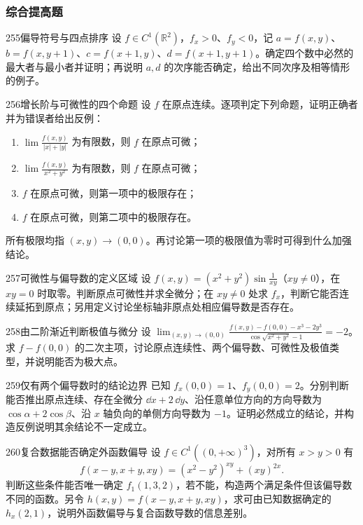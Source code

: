 \subsubsection{综合提高题}
\begin{exercise}{255}{偏导符号与四点排序}
设 $f\in C^1(\mathbb R^2)$，$f_x>0$、$f_y<0$，记 $a=f(x,y)$、$b=f(x,y+1)$、$c=f(x+1,y)$、$d=f(x+1,y+1)$。确定四个数中必然的最大者与最小者并证明；再说明 $a,d$ 的次序能否确定，给出不同次序及相等情形的例子。
\end{exercise}
\begin{exercise}{256}{增长阶与可微性的四个命题}
设 $f$ 在原点连续。逐项判定下列命题，证明正确者并为错误者给出反例：
\begin{enumerate}
\item $\lim\frac{f(x,y)}{|x|+|y|}$ 为有限数，则 $f$ 在原点可微；
\item $\lim\frac{f(x,y)}{x^2+y^2}$ 为有限数，则 $f$ 在原点可微；
\item $f$ 在原点可微，则第一项中的极限存在；
\item $f$ 在原点可微，则第二项中的极限存在。
\end{enumerate}
所有极限均指 $(x,y)\to(0,0)$。再讨论第一项的极限值为零时可得到什么加强结论。
\end{exercise}
\begin{exercise}{257}{可微性与偏导数的定义区域}
设 $f(x,y)=(x^2+y^2)\sin\frac1{xy}$（$xy\ne0$），在 $xy=0$ 时取零。判断原点可微性并求全微分；在 $xy\ne0$ 处求 $f_x$，判断它能否连续延拓到原点；另用定义讨论坐标轴非原点处相应偏导数是否存在。
\end{exercise}
\begin{exercise}{258}{由二阶渐近判断极值与微分}
设 $\lim_{(x,y)\to(0,0)}\frac{f(x,y)-f(0,0)-x^3-2y^3}{\cos\sqrt{x^2+y^2}-1}=-2$。求 $f-f(0,0)$ 的二次主项，讨论原点连续性、两个偏导数、可微性及极值类型，并说明能否为极大点。
\end{exercise}
\begin{exercise}{259}{仅有两个偏导数时的结论边界}
已知 $f_x(0,0)=1$、$f_y(0,0)=2$。分别判断能否推出原点连续、存在全微分 $\dd x+2\,\dd y$、沿任意单位方向的方向导数为 $\cos\alpha+2\cos\beta$、沿 $x$ 轴负向的单侧方向导数为 $-1$。证明必然成立的结论，并构造反例说明其余结论不一定成立。
\end{exercise}
\begin{exercise}{260}{复合数据能否确定外函数偏导}
设 $f\in C^1((0,+\infty)^3)$，对所有 $x>y>0$ 有
\[
f(x-y,x+y,xy)=(x^2-y^2)^{xy}+(xy)^{2x}.
\]
判断这些条件能否唯一确定 $f_1(1,3,2)$，若不能，构造两个满足条件但该偏导数不同的函数。另令 $h(x,y)=f(x-y,x+y,xy)$，求可由已知数据确定的 $h_x(2,1)$，说明外函数偏导与复合函数导数的信息差别。
\end{exercise}

